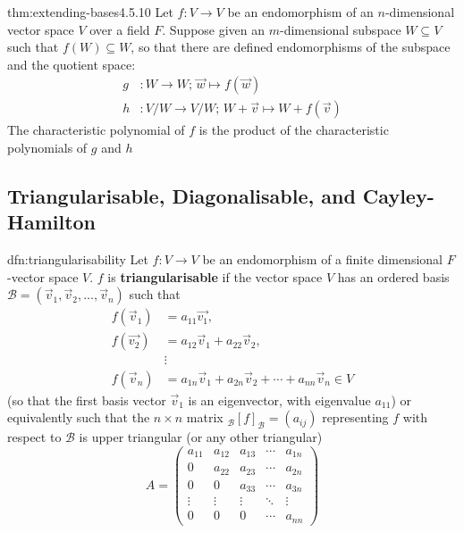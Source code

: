 \documentclass[landscape, 8pt]{extarticle}
\begin{document}
\begin{multicols}{3}
\begin{thm}{thm:extending-bases}{4.5.10}
    Let $f : V\to V$ be an endomorphism of an $n$-dimensional vector space $V$ over a field $F$. Suppose given an $m$-dimensional subspace $W\subseteq V$ such that $f(W)\subseteq W$, so that there are defined endomorphisms of the subspace and the quotient space:
    \begin{align*}
        g &: W \to W;\, \vec{w}\mapsto f(\vec{w})\\
        h &: V / W \to V / W;\, W + \vec{v} \mapsto W + f(\vec{v})
    \end{align*}
    The characteristic polynomial of $f$ is the product of the characteristic polynomials of $g$ and $h$
\end{thm}

\subsection{Triangularisable, Diagonalisable, and Cayley-Hamilton}

\begin{dfn}[Triangularisability]{dfn:triangularisability}{}
    Let $f : V \to V$ be an endomorphism of a finite dimensional $F$-vector space $V$. $f$ is \textbf{triangularisable} if the vector space $V$ has an ordered basis $\mathcal{B} = (\vec{v}_{1}, \vec{v}_{2},\dots,\vec{v}_{n})$ such that
        \begin{align*}
            f(\vec{v}_{1}) &= a_{11}\vec{v_{1}}, \\
            f(\vec{v_{2}}) &= a_{12}\vec{v}_{1} + a_{22}\vec{v}_{2}, \\
            &\vdots \\
            f(\vec{v}_{n}) &= a_{1n}\vec{v}_{1} + a_{2n}\vec{v}_{2} + \cdots + a_{nn}\vec{v}_{n}\in V
        \end{align*}
        (so that the first basis vector $\vec{v}_{1}$ is an eigenvector, with eigenvalue $a_{11}$) or equivalently such that the $n \times n$ matrix $_{\mathcal{B}}[f]_{\mathcal{B}} = (a_{ij})$ representing $f$ with respect to $\mathcal{B}$ is upper triangular (or any other triangular)
        \[A = \begin{pmatrix}
            a_{11}& a_{12}& a_{13}& \cdots & a_{1n} \\
            0& a_{22}& a_{23}& \cdots& a_{2n} \\
            0 & 0& a_{33}& \cdots& a_{3n} \\
            \vdots& \vdots& \vdots& \ddots& \vdots \\
            0 & 0& 0& \cdots& a_{nn}
        \end{pmatrix}\]
\end{dfn}



\end{multicols}
\end{document}
